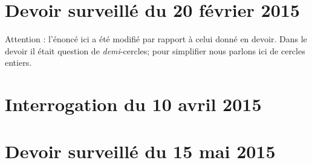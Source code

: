 \section{Devoir surveillé du 20 février 2015}


Attention : l'énoncé ici a été modifié par rapport à celui donné en devoir. Dans le devoir il était question de \emph{demi}-cercles; pour simplifier nous parlons ici de cercles entiers.


\section{Interrogation du 10 avril 2015}


\section{Devoir surveillé du 15 mai 2015}

